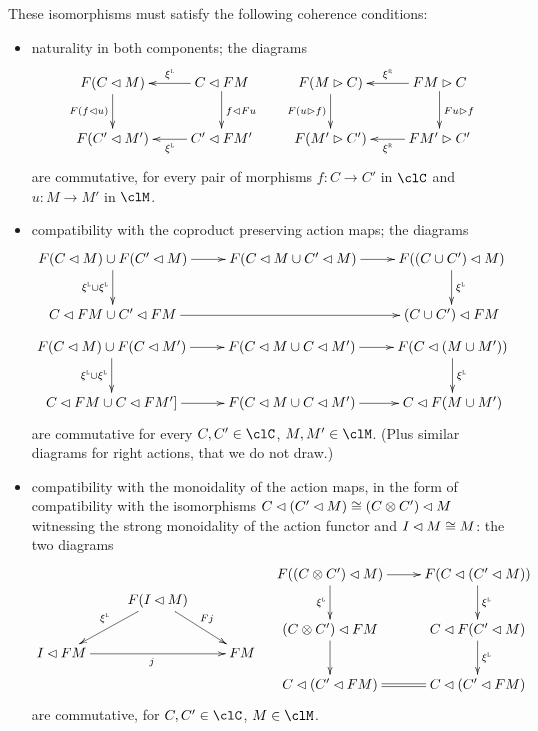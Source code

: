 \begin{definition}
	These isomorphisms must satisfy the following coherence conditions:
	\begin{itemize}
		\item naturality in both components; the diagrams
		      \[\xymatrix{
			      F(C\lact M) \ar@{<-}[r]^-{\xi^{\l}}\ar[d]_{F(f\lact u)} & C \lact FM \ar[d]^{f\lact Fu}& F(M\ract C) \ar@{<-}[r]^-{\xi^{\r}}\ar[d]_{F(u\ract f)}&  FM\ract C\ar[d]^{Fu\ract f}\\
			      F(C'\lact M') \ar@{<-}[r]_-{\xi^{\l}} & C' \lact FM' & F(M'\ract C') \ar@{<-}[r]_-{\xi^{\r}}& FM'\ract C'
			      }\]
		      are commutative, for every pair of morphisms $f : C\to C'$ in $\clC$ and $u : M\to M'$ in $\clM$.
		\item compatibility with the coproduct preserving action maps; the diagrams
		      \[\xymatrix{
			      F(C\lact M) \cup F(C'\lact M)\ar[r]\ar[d]_{\xi^{\l}\cup \xi^{\l}} & F(C\lact M \cup C'\lact M) \ar[r]& F((C\cup C')\lact M) \ar[d]^{\xi^{\l}}\\ C\lact FM \cup C'\lact FM \ar[rr] && (C\cup C')\lact FM
			      }\]
		      \[\xymatrix{
			      F(C\lact M) \cup F(C\lact M') \ar[r]\ar[d]_{\xi^{\l}\cup \xi^{\l}}& F(C\lact M \cup C\lact M')\ar[r] & F(C\lact (M\cup M'))\ar[d]^{\xi^{\l}} \\
			      C\lact FM \cup C\lact FM' \ar[r]]& F(C\lact M\cup C\lact M')\ar[r] & C\lact F(M\cup M')
			      }\]
		      are commutative for every $C,C'\in\clC$, $M,M'\in\clM$. (Plus similar diagrams for right actions, that we do not draw.)
		\item compatibility with the monoidality of the action maps, in the form of compatibility with the isomorphisms $C\lhd (C'\lhd M)\cong (C\otimes C')\lhd M$ witnessing the strong monoidality of the action functor and $I\lhd M\cong M$: the two diagrams
		      \[\vcenter{\xymatrix{
			      &F(I\lact M)\ar[dr]^{Fj}\ar[dl]_{\xi^{\l}}& \\
			      I\lact FM \ar[rr]_j && FM
			      }}\quad
			      \vcenter{\xymatrix{
			      F((C\otimes C')\lact M) \ar[r]\ar[d]_{\xi^{\l}}& F(C\lact (C'\lact M))\ar[d]^{\xi^{\l}} \\
			      (C\otimes C')\lact FM \ar[d]& C\lact F(C'\lact M)\ar[d]^{\xi^{\l}} \\
			      C\lact (C'\lact FM) \ar@{=}[r] & C\lact (C'\lact FM)
			      }}\]
		      are commutative, for $C, C'\in\clC$, $M\in\clM$.%
	\end{itemize}
\end{definition}

